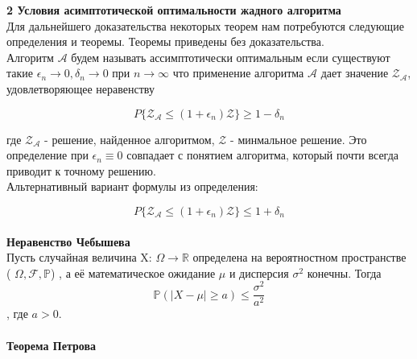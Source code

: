 \documentclass[a4paper, 14pt]{extarticle}
\begin{document}
\newcommand{\algorithm}{$\mathcal{A'}$}
\newcommand{\topboundE}{$\mathcal{Z^*_{A'}}$}
\newcommand{\topboundD}{$\mathcal{D^*_{A'}}$}
\newcommand{\randomvalue}{$\mathcal{Z_{A'}}$}
\newcommand{\randomvalueE}{$E(\text{\randomvalue})$}
\newcommand{\randomvalueD}{$D(\text{\randomvalue})$}

\textbf{2 Условия асимптотической оптимальности жадного алгоритма}\\

Для дальнейшего доказательства некоторых теорем нам потребуются следующие определения и теоремы. Теоремы приведены без доказательства.\\


Алгоритм $\mathcal{A}$ будем называть ассимптотически оптимальным если существуют такие $\epsilon_n \rightarrow 0, \delta_n \rightarrow 0$ при $n \rightarrow \infty$ что применение алгоритма $\mathcal{A}$ дает значение  $\mathcal{Z_A}$, удовлетворяющее неравенству
 
\begin{equation}\label{1}
P\{\mathcal{Z_A} \leq (1+\epsilon_n)\mathcal{Z}\}\geq 1-\delta_n
\end{equation}

где $\mathcal{Z_A}$ - решение, найденное алгоритмом, $\mathcal{Z}$ - минмальное решение.
Это определение при $\epsilon_n \equiv 0$ совпадает с понятием алгоритма, который почти всегда приводит к точному решению. \\

Альтернативный вариант формулы из определения:

\begin{equation}
P\{\mathcal{Z_A} \leq (1+\epsilon_n)\mathcal{Z}\}\leq 1+\delta_n
\end{equation} \\


\textbf{Неравенство Чебышева} \\

Пусть случайная величина X: $\Omega\rightarrow\mathbb {R}$ определена на вероятностном пространстве ( $\Omega,{\mathcal {F}},\mathbb {P} $)
, а её математическое ожидание $\mu$ и дисперсия  $\sigma ^{2}$ конечны. Тогда 
\begin{equation}
{\mathbb {P}}\left(|X-\mu |\geqslant a\right)\leqslant {\frac {\sigma ^{2}}{a^{2}}}
\end{equation},
где  $a>0$. \\ \\


\textbf{Теорема Петрова} \\
\end{document}
